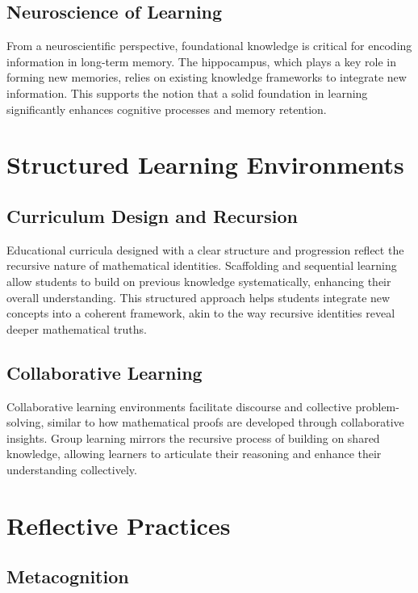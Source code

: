 \documentclass{article}
\begin{document}
\subsection{Neuroscience of Learning}

From a neuroscientific perspective, foundational knowledge is critical for encoding information in long-term memory. The hippocampus, which plays a key role in forming new memories, relies on existing knowledge frameworks to integrate new information. This supports the notion that a solid foundation in learning significantly enhances cognitive processes and memory retention.

\section{Structured Learning Environments}

\subsection{Curriculum Design and Recursion}

Educational curricula designed with a clear structure and progression reflect the recursive nature of mathematical identities. Scaffolding and sequential learning allow students to build on previous knowledge systematically, enhancing their overall understanding. This structured approach helps students integrate new concepts into a coherent framework, akin to the way recursive identities reveal deeper mathematical truths.

\subsection{Collaborative Learning}

Collaborative learning environments facilitate discourse and collective problem-solving, similar to how mathematical proofs are developed through collaborative insights. Group learning mirrors the recursive process of building on shared knowledge, allowing learners to articulate their reasoning and enhance their understanding collectively.

\section{Reflective Practices}

\subsection{Metacognition}
\end{document}
